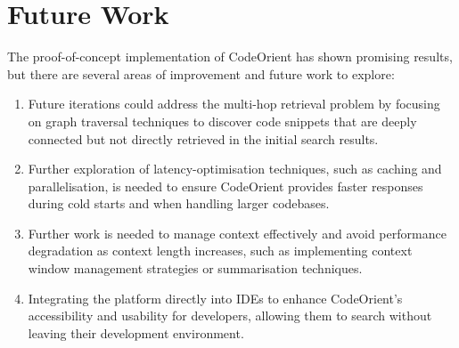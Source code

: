\section{Future Work}
The proof-of-concept implementation of CodeOrient has shown promising results, but there are several areas of improvement and future work to explore:
\begin{enumerate}
    \item Future iterations could address the multi-hop retrieval problem by focusing on graph traversal techniques to discover code snippets that are deeply connected but not directly retrieved in the initial search results.
    \item Further exploration of latency-optimisation techniques, such as caching and parallelisation, is needed to ensure CodeOrient provides faster responses during cold starts and when handling larger codebases.
    \item Further work is needed to manage context effectively and avoid performance degradation as context length increases, such as implementing context window management strategies or summarisation techniques.
    \item Integrating the platform directly into IDEs to enhance CodeOrient's accessibility and usability for developers, allowing them to search without leaving their development environment.
\end{enumerate}